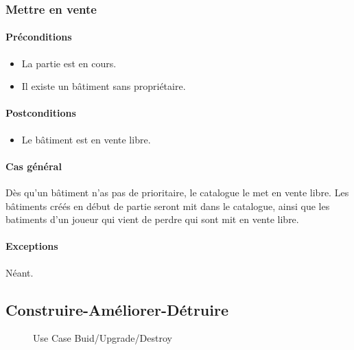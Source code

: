 \documentclass[a4paper,11pt]{report}
\begin{document}
\subsubsection{Mettre en vente}
\paragraph{Préconditions}
\begin{itemize}
 \item La partie est en cours.
 \item Il existe un bâtiment sans propriétaire.
\end{itemize}
\paragraph{Postconditions}
\begin{itemize}
 \item Le bâtiment est en vente libre.
\end{itemize}
\paragraph{Cas général}
Dès qu'un bâtiment n'as pas de prioritaire, le catalogue le met en vente libre. Les bâtiments créés en début de partie seront mit dans le catalogue, ainsi que les batiments d'un joueur qui vient de perdre qui sont mit en vente libre.
\paragraph{Exceptions} Néant.

\newpage
\subsection{Construire-Améliorer-Détruire}
\begin{figure}[ht]
    \caption{Use Case Buid/Upgrade/Destroy}
\end{figure}
\end{document}
